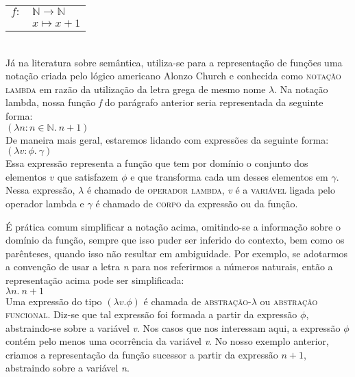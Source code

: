 \n \begin{tabular}{l l} 
	$f:$ & $\mathbb{N} \rightarrow \mathbb{N}$\\  
	     &  $x \mapsto x + 1$\\ 
   \end{tabular} \\


Já na literatura sobre semântica, utiliza-se para a representação de funções uma notação criada pelo
lógico americano Alonzo Church e conhecida como \textsc{notação
lambda} em razão da utilização da letra grega de mesmo nome
$\lambda$. Na notação lambda, nossa função \textit{f} do
parágrafo anterior seria
representada da seguinte forma:\\

\n $(\lambda n: n \in \mathbb{N}.\ n + 1)$\\

\n De maneira mais geral, estaremos lidando com expressões da
seguinte forma:\\

\n $(\lambda v:\phi .\ \gamma)$\\

\n Essa expressão representa a função que tem por domínio o
conjunto dos elementos $v$ que satisfazem $\phi$ e que transforma
cada um desses elementos em $\gamma$. Nessa expressão, $\lambda$ é
chamado de \textsc{operador lambda}, \textit{v} é a \textsc{variável}
ligada pelo operador lambda e $\gamma$ é chamado de \textsc{corpo}
da expressão ou da função.

É prática comum simplificar a notação acima, omitindo-se a
informação sobre o domínio da função, sempre que isso puder
ser inferido do contexto, bem como os parênteses, quando isso não resultar em ambiguidade. Por exemplo, se adotarmos 
a convenção de usar a letra \textit{n} para nos referirmos a
números naturais, então a representação acima pode ser simplificada:\\

\n $\lambda n.\ n + 1$\\

\n Uma expressão do tipo $(\lambda v. \phi)$ é chamada de
\textsc{abstração}-$\lambda$ ou \textsc{abstração funcional}.
Diz-se que tal expressão foi formada a partir da expressão $\phi$,
abstraindo-se sobre a variável \textit{v}. Nos casos que nos
interessam aqui, a expressão $\phi$ contém pelo menos uma
ocorrência da variável \textit{v}. No nosso exemplo
anterior, criamos a representação da função sucessor a partir
da expressão $n + 1$, abstraindo sobre a variável \textit{n}.

